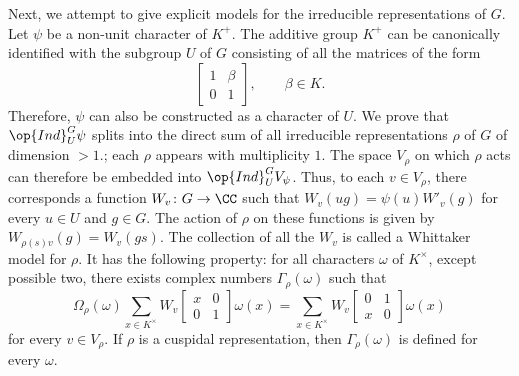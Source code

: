 \documentclass[../main.tex]{subfiles}
\begin{document}
Next, we attempt to give explicit models for the irreducible representations of $G$. Let $\psi$ be a non-unit character of $K^+$. The additive group $K^+$ can be canonically identified with the subgroup $U$ of $G$ consisting of all the matrices of the form
\[\begin{bmatrix}
	1 & \beta \\
	0 & 1
\end{bmatrix},\qquad\beta\in K.\]
Therefore, $\psi$ can also be constructed as a character of $U$. We prove that $\op{Ind}^G_U\psi$ splits into the direct sum of all irreducible representations $\rho$ of $G$ of dimension $>1$.; each $\rho$ appears with multiplicity $1$. The space $V_\rho$ on which $\rho$ acts can therefore be embedded into $\op{Ind}^G_UV_\psi$. Thus, to each $v\in V_\rho$, there corresponds a function $W_v\colon G\to\CC$ such that $W_v(ug)=\psi(u)W'_v(g)$ for every $u\in U$ and $g\in G$. The action of $\rho$ on these functions is given by $W_{\rho(s)v}(g)=W_v(gs)$. The collection of all the $W_v$ is called a Whittaker model for $\rho$. It has the following property: for all characters $\omega$ of $K^\times$, except possible two, there exists complex numbers $\Gamma_\rho(\omega)$ such that
\begin{equation}
	\Omega_\rho(\omega)\sum_{x\in K^\times}W_v\begin{bmatrix}
		x & 0 \\
		0 & 1
	\end{bmatrix}\omega(x)=\sum_{x\in K^\times}W_v\begin{bmatrix}
		0 & 1 \\
		x & 0
	\end{bmatrix}\omega(x) \label{eq:fund-eq-whittaker}
\end{equation}
for every $v\in V_\rho$. If $\rho$ is a cuspidal representation, then $\Gamma_\rho(\omega)$ is defined for every $\omega$.
\end{document}
